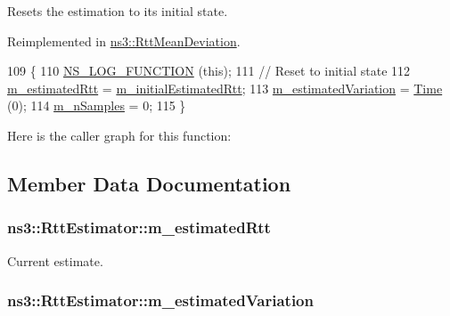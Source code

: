 Resets the estimation to its initial state. 



Reimplemented in \hyperlink{classns3_1_1RttMeanDeviation_a5a215a2ed1380c064cb38dbd09c88677}{ns3\+::\+Rtt\+Mean\+Deviation}.


\begin{DoxyCode}
109 \{ 
110   \hyperlink{log-macros-disabled_8h_a90b90d5bad1f39cb1b64923ea94c0761}{NS\_LOG\_FUNCTION} (\textcolor{keyword}{this});
111   \textcolor{comment}{// Reset to initial state}
112   \hyperlink{classns3_1_1RttEstimator_ac39ddf21dd9bd99416704b83650d2812}{m\_estimatedRtt} = \hyperlink{classns3_1_1RttEstimator_a2885f370c9d2ca8ec352de341c065497}{m\_initialEstimatedRtt};
113   \hyperlink{classns3_1_1RttEstimator_a5519242fbbbf189c996e7fd7da2d7085}{m\_estimatedVariation} = \hyperlink{namespacens3_1_1TracedValueCallback_a7ffd3e7c142ffe7c8a1d2db9b8de38ec}{Time} (0);
114   \hyperlink{classns3_1_1RttEstimator_a6a70cc48220dae4db259cb5cfee86cf5}{m\_nSamples} = 0;
115 \}
\end{DoxyCode}


Here is the caller graph for this function\+:




\subsection{Member Data Documentation}
\subsubsection[{\texorpdfstring{m\+\_\+estimated\+Rtt}{m_estimatedRtt}}]{ ns3\+::\+Rtt\+Estimator\+::m\+\_\+estimated\+Rtt\hspace{0.3cm}{\ttfamily [protected]}}\hypertarget{classns3_1_1RttEstimator_ac39ddf21dd9bd99416704b83650d2812}{}\label{classns3_1_1RttEstimator_ac39ddf21dd9bd99416704b83650d2812}


Current estimate. 

\subsubsection[{\texorpdfstring{m\+\_\+estimated\+Variation}{m_estimatedVariation}}]{ ns3\+::\+Rtt\+Estimator\+::m\+\_\+estimated\+Variation\hspace{0.3cm}{\ttfamily [protected]}}\hypertarget{classns3_1_1RttEstimator_a5519242fbbbf189c996e7fd7da2d7085}{}\label{classns3_1_1RttEstimator_a5519242fbbbf189c996e7fd7da2d7085}


